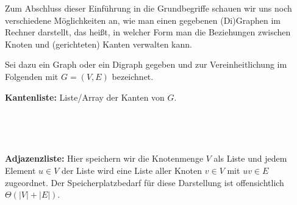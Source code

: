 \begin{bem}
Zum Abschluss dieser Einführung in die Grundbegriffe schauen wir uns noch verschiedene Möglichkeiten an, wie man einen gegebenen (Di)Graphen im Rechner darstellt, das heißt, in welcher Form man die Beziehungen zwischen Knoten und (gerichteten) Kanten verwalten kann.

Sei dazu ein Graph oder ein Digraph gegeben und zur Vereinheitlichung im Folgenden mit $G=(V,E)$ bezeichnet.
\end{bem} 

\begin{defn}
{\bfseries Kantenliste:} Liste/Array der Kanten von $G$. 
\end{defn}

\begin{bsp}\ 
\begin{center}
\hfill
{}
\hfill
{}
\hfill\,
\end{center}
\end{bsp}

\begin{defn} 
{\bfseries Adjazenzliste:} Hier speichern wir die Knotenmenge $V$ als Liste und jedem Element $u \in V$ der Liste wird eine Liste aller Knoten $v \in V$ mit $uv \in E$ zugeordnet.
Der Speicherplatzbedarf für diese Darstellung ist offensichtlich $\Theta(|V|+|E|)$.
\end{defn}

